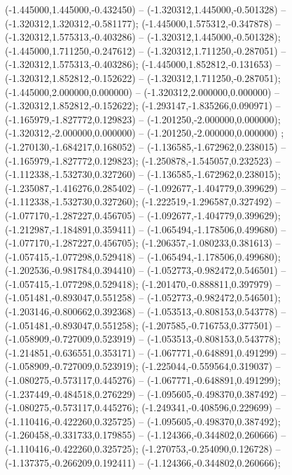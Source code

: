 (-1.445000,1.445000,-0.432450) -- (-1.320312,1.445000,-0.501328) -- (-1.320312,1.320312,-0.581177);
 (-1.445000,1.575312,-0.347878) -- (-1.320312,1.575313,-0.403286) -- (-1.320312,1.445000,-0.501328);
 (-1.445000,1.711250,-0.247612) -- (-1.320312,1.711250,-0.287051) -- (-1.320312,1.575313,-0.403286);
 (-1.445000,1.852812,-0.131653) -- (-1.320312,1.852812,-0.152622) -- (-1.320312,1.711250,-0.287051);
 (-1.445000,2.000000,0.000000) -- (-1.320312,2.000000,0.000000) -- (-1.320312,1.852812,-0.152622);
 (-1.293147,-1.835266,0.090971) -- (-1.165979,-1.827772,0.129823) -- (-1.201250,-2.000000,0.000000);
 (-1.320312,-2.000000,0.000000) -- (-1.201250,-2.000000,0.000000) ;
 (-1.270130,-1.684217,0.168052) -- (-1.136585,-1.672962,0.238015) -- (-1.165979,-1.827772,0.129823);
 (-1.250878,-1.545057,0.232523) -- (-1.112338,-1.532730,0.327260) -- (-1.136585,-1.672962,0.238015);
 (-1.235087,-1.416276,0.285402) -- (-1.092677,-1.404779,0.399629) -- (-1.112338,-1.532730,0.327260);
 (-1.222519,-1.296587,0.327492) -- (-1.077170,-1.287227,0.456705) -- (-1.092677,-1.404779,0.399629);
 (-1.212987,-1.184891,0.359411) -- (-1.065494,-1.178506,0.499680) -- (-1.077170,-1.287227,0.456705);
 (-1.206357,-1.080233,0.381613) -- (-1.057415,-1.077298,0.529418) -- (-1.065494,-1.178506,0.499680);
 (-1.202536,-0.981784,0.394410) -- (-1.052773,-0.982472,0.546501) -- (-1.057415,-1.077298,0.529418);
 (-1.201470,-0.888811,0.397979) -- (-1.051481,-0.893047,0.551258) -- (-1.052773,-0.982472,0.546501);
 (-1.203146,-0.800662,0.392368) -- (-1.053513,-0.808153,0.543778) -- (-1.051481,-0.893047,0.551258);
 (-1.207585,-0.716753,0.377501) -- (-1.058909,-0.727009,0.523919) -- (-1.053513,-0.808153,0.543778);
 (-1.214851,-0.636551,0.353171) -- (-1.067771,-0.648891,0.491299) -- (-1.058909,-0.727009,0.523919);
 (-1.225044,-0.559564,0.319037) -- (-1.080275,-0.573117,0.445276) -- (-1.067771,-0.648891,0.491299);
 (-1.237449,-0.484518,0.276229) -- (-1.095605,-0.498370,0.387492) -- (-1.080275,-0.573117,0.445276);
 (-1.249341,-0.408596,0.229699) -- (-1.110416,-0.422260,0.325725) -- (-1.095605,-0.498370,0.387492);
 (-1.260458,-0.331733,0.179855) -- (-1.124366,-0.344802,0.260666) -- (-1.110416,-0.422260,0.325725);
 (-1.270753,-0.254090,0.126728) -- (-1.137375,-0.266209,0.192411) -- (-1.124366,-0.344802,0.260666);
